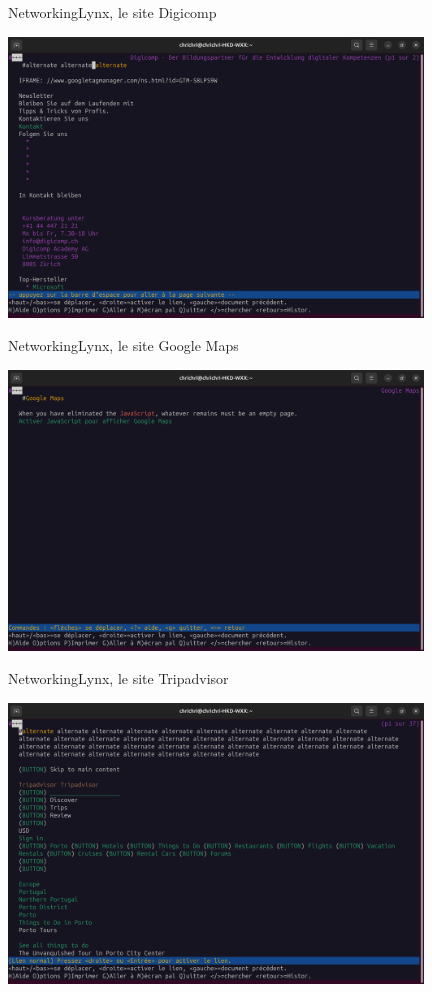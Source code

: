 \documentclass{beamer}
\begin{document}
    \begin{frame}{Networking}{Lynx, le site Digicomp}
        \begin{center}
            \includegraphics[width=11cm]{image/lynx-digicomp}
        \end{center}
    \end{frame}

    \begin{frame}{Networking}{Lynx, le site Google Maps}
        \begin{center}
            \includegraphics[width=11cm]{image/lynx-gmaps}
        \end{center}
    \end{frame}

    \begin{frame}{Networking}{Lynx, le site Tripadvisor}
        \begin{center}
            \includegraphics[width=11cm]{image/lynx-tripadvisor}
        \end{center}
    \end{frame}
\end{document}

